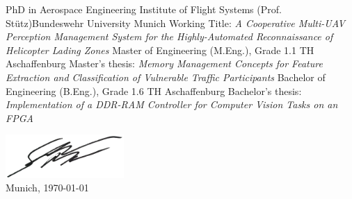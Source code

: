 		{PhD in Aerospace Engineering}
		{{Institute of Flight Systems (Prof. Stütz)\newline Bundeswehr University Munich}}
		{Working Title: \textit{\glqq A Cooperative Multi-UAV Perception Management System for the Highly-Automated Reconnaissance of Helicopter Lading Zones\grqq}}
		{}
	\vfill\null
		{Master of Engineering (M.Eng.), Grade 1.1}
		{TH Aschaffenburg}
		{Master's thesis: \textit{\glqq Memory Management Concepts for Feature Extraction and Classification of Vulnerable Traffic Participants\grqq}}
		{}
	\vfill\null
		{Bachelor of Engineering (B.Eng.), Grade 1.6}
		{TH Aschaffenburg}
		{Bachelor's thesis: \textit{\glqq Implementation of a DDR-RAM Controller for Computer Vision Tasks on an FPGA\grqq}}
		{}
	\vfill\null

\mbox{}
\vfill
\mbox{}
\vfill
\mbox{}
\vfill
\mbox{}
\vfill
\mbox{}
\vfill

\hspace*{5.5cm}\includegraphics[width=4.5cm]{resources/unterschrift_klein}\\[-6pt]
Munich, \today     \hspace{1cm}   \hrulefill

\hspace*{30mm}\phantom{Munich, \today }\name
